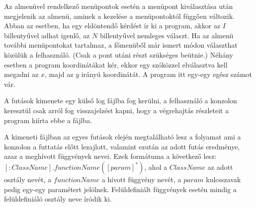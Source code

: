 Az almenüvel rendelkező menüpontok esetén a menüpont kiválasztása után megjelenik az almenü, aminek a kezelése a menüpontoktól függően változik. Abban az esetben, ha egy eldöntendő kérdést ír ki a program, akkor az $I$ billentyűvel adhat igenlő, az $N$ billentyűvel nemleges választ. Ha az almenü további menüpontokat tartalmaz, a főmenüből már ismert módon választhat közülük a felhasználó. (Csak a pont utáni részt szükséges beütnie.) Néhány esetben a program koordinátákat kér, ekkor egy szóközzel elválasztva kell megadni az $x$, majd az $y$ irányú koordinátát. A program itt egy-egy egész számot vár.\\
\par

A futások kimenete egy külső log fájlba fog kerülni, a felhasználó a konzolon keresztül csak arról fog visszajelzést kapni, hogy a végrehajtás részleteit a program kiírta ebbe a fájlba.\\
\par

A kimeneti fájlban az egyes futások elején megtalálható lesz a folyamat ami a konzolon a futtatás előtt lezajlott, valamint ezután az adott futás eredménye, azaz a meghívott függvények nevei. Ezek formátuma a következő lesz: $\left[ :ClassName\right].functionName(\left[ param \right]^*)$, ahol a $ClassName$ az adott osztály nevét, a $functionName$ a hívott függvény nevét, a $param$ kulcsszavak pedig egy-egy paramétert jelölnek. Felüldefiniált függvények esetén mindig a felüldefiniáló osztály neve íródik ki.

